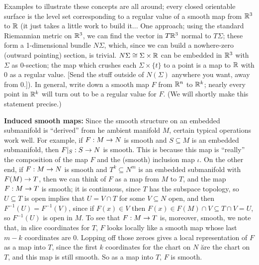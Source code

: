 Examples to illustrate these concepts are all around; every closed orientable surface is the
level set corresponding to a regular value of a smooth map from ${\Bbb R}^3$ to ${\Bbb R}$ (it just takes a 
little work to build it... One approach; using the standard
Riemannian metric on ${\Bbb R}^3$, we can find the vector in 
$T{\Bbb R}^3$ normal to $T\Sigma$; these form a 1-dimensional bundle $N\Sigma$, which, since
we can build a nowhere-zero (outward pointing) section, is trivial. 
$N\Sigma\cong \Sigma\times {\Bbb R}$ can be embedded in ${\Bbb R}^3$
with $\Sigma$ as $0$-section; the map which crushes each $\Sigma\times\{t\}$ to a point is a map 
to ${\Bbb R}$ with $0$ as a regular value. [Send the stuff outside of $N(\Sigma)$ anywhere
you want, away from $0$.]). In general, write down a smooth map $F$ from 
${\Bbb R}^n$ to ${\Bbb R}^k$; nearly 
every point in ${\Bbb R}^k$ will turn out to be a regular value for $F$. (We will shortly make this
statement precise.) 

\msk

{\bf Induced smooth maps:} Since the smooth structure on an embedded submanifold is ``derived'' from he ambient manifold $M$,
certain typical operations work well. For example, if $F:M\rightarrow N$ is smooth and
$S\subseteq M$ is an embedded submanifold, then $F|_S:S\rightarrow N$ is smooth. This is
because this map is ``really'' the composition of the map $F$ and the (smooth) inclusion map $\iota$.
On the other end, if 
$F:M\rightarrow N$ is smooth and $T^k\subseteq N^m$ is an embedded submanifold with $F(M)\rightarrow T$, then
we can think of $F$ as a map from $M$ to $T$, and the map $F:M\rightarrow T$ is smooth; it is
continuous, since $T$ has the subspace topology, so $U\subseteq T$ is open
implies that $U=V\cap T$ for some $V\subseteq N$ open,
and then $F^{-1}(U)=F^{-1}(V)$, since if $F(x)\in V$ then $F(x)\in F(M)\cap V\subseteq T\cap V=U$,
so $F^{-1}(U)$ is open in $M$. To see that $F:M\rightarrow T$ is, moreover, smooth, we note that,
in slice coordinates for $T$, $F$ looks locally like a smooth map whose last $m-k$ 
coordinates are $0$. Lopping off those zeroes gives a local representation of $F$ as a map
into $T$, since the first $k$ coordinates for the chart on $N$ \u{are} the chart on $T$,
and this map is still smooth. So as a map into $T$, $F$ is smooth.


